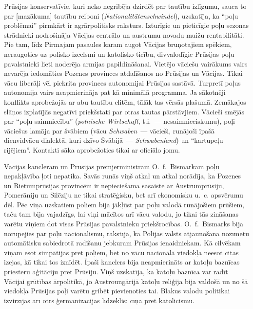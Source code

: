 \documentclass[twoside,a5paper,12pt,fleqn,openany]{extbook}
\newcommand{\pltxti}[1]{\textit{\textpolish{#1}}}
\newcommand{\detxti}[1]{\textit{\textgerman{#1}}}
\begin{document}
Prūsijas konservatīvie, kuri neko negribēja dzirdēt par tautību izlīgumu, sauca to par [mazākuma] tautību reiboni (\detxti{Nationalitätenschwindel}), uzskatīja, ka ``poļu problēmai'' pirmkārt ir agrārpolitisks raksturs. Izturīgie un pieticīgie poļu sezonas strādnieki nodrošināja Vācijas centrālo un austrumu novadu muižu rentabilitāti. Pie tam, līdz Pirmajam pasaules karam augot Vācijas bruņotajiem spēkiem, neraugoties uz polisko izcelsmi un katolisko ticību, divvalodīgie Prūsijas poļu pavalstnieki lieti noderēja armijas papildināšanai. Vietējo vāciešu vairākums vairs nevarēja iedomāties Pozenes provinces atdalīšanos no Prūsijas un Vācijas. Tikai vācu liberāļi vēl piekrita provinces autonomijai Prūsijas sastāvā. Turpretī poļus autonomija vairs neapmierināja pat kā minimālā programma. Ja sākotnēji konflikts aprobežojās ar abu tautību elitēm, tālāk tas vērsās plašumā. Zemākajos slāņos izplatījās negatīvi priekšstati par otras tautas pārstāvjiem. Vācieši smējās par ``poļu saimniecību'' (\pltxti{polnische Wirtschaft}, t.i.~--- nesaimnieciskumu), poļi vāciešus lamāja par švābiem (vācu \detxti{Schwaben}~--- vācieši, runājoši īpašā dienvidvācu dialektā, kuri dzīvo Švābijā~--- \detxti{Schwabenland}) un ``kartupeļu rijējiem''. Kontakti sāka aprobežoties tikai ar oficiālo jomu.

Vācijas kancleram un Prūsijas premjerministram O.~f.~Bismarkam poļu nepakļāvība ļoti nepatika. Savās runās viņš atkal un atkal norādīja, ka Pozenes un Rietumprūsijas provincēm ir nepieciešama sasaiste ar Austrumprūsiju, Pomerāniju un Silēziju ne tikai stratēģisku, bet arī ekonomisku u.~c. apsvērumu dēļ. Pēc viņa uzskatiem poļiem bija jākļūst par poļu valodā runājošiem prūšiem, taču tam bija vajadzīgs, lai viņi mācītos arī vācu valodu, jo tikai tās zināšanas varētu viņiem dot visas Prūsijas pavalstnieku priekšrocības. O.~f.~Bismarks bija norūpējies par poļu nacionālismu, rakstīja, ka Polijas valsts atjaunošana nozīmētu automātisku sabiedrotā radīšanu jebkuram Prūsijas ienaidniekam. Kā cilvēkam viņam esot simpātijas pret poļiem, bet no vācu nacionālā viedokļa neesot citas izejas, kā tikai tos iznīdēt. Īpaši kanclers bija neapmierināts ar katoļu baznīcas priesteru aģitāciju pret Prūsiju. Viņš uzskatīja, ka katoļu baznīca var radīt Vācijai grūtības ārpolitikā, jo Austroungārijā katoļu reliģija bija valdošā un no šā viedokļa Prūsijas poļi varētu gribēt pievienoties tai. Blakus valodu politikai izvirzījās arī otrs ģermanizācijas līdzeklis: cīņa pret katolicismu.
\end{document}

